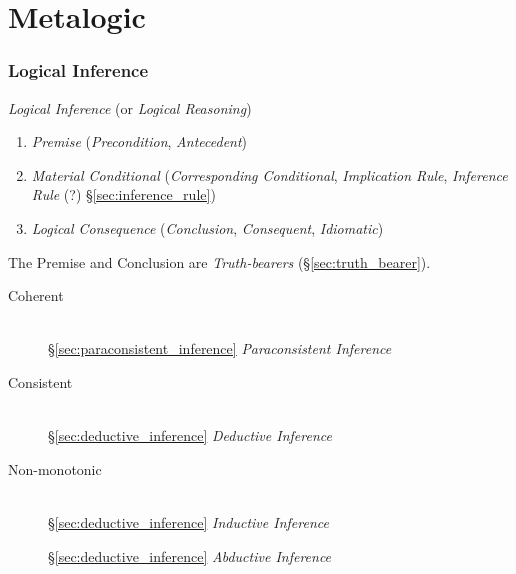 \part{Metalogic}\label{sec:metalogic}

\section{Logical Inference}\label{sec:logical_inference}

\emph{Logical Inference} (or \emph{Logical Reasoning})

\begin{enumerate}
\item \emph{Premise} (\emph{Precondition}, \emph{Antecedent})

\item \emph{Material Conditional} (\emph{Corresponding Conditional},
  \emph{Implication Rule}, \emph{Inference Rule} (?)
  \S\ref{sec:inference_rule})

\item \emph{Logical Consequence} (\emph{Conclusion},
  \emph{Consequent}, \emph{Idiomatic})
\end{enumerate}

The Premise and Conclusion are \emph{Truth-bearers}
(\S\ref{sec:truth_bearer}).

\begin{description}
\item [Coherent] \hfill\\
    \S\ref{sec:paraconsistent_inference}
    \emph{Paraconsistent Inference}

\item [Consistent] \hfill\\
    \S\ref{sec:deductive_inference} \emph{Deductive Inference}

\item [Non-monotonic] \hfill\\
    \S\ref{sec:deductive_inference} \emph{Inductive Inference}

    \S\ref{sec:deductive_inference} \emph{Abductive Inference}

\end{description}



